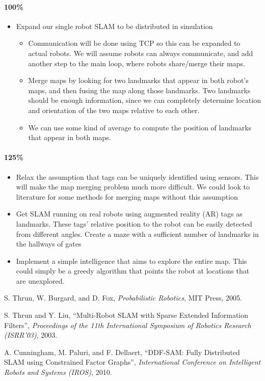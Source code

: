 \documentclass[11pt]{article}
\begin{document}
\paragraph{100\%}

\begin{itemize}
    \item Expand our single robot SLAM to be distributed in simulation
    \begin{itemize}
        \item Communication will be done using TCP so this can be expanded to actual robots. We will assume robots can always communicate, and add another step to the main loop, where robots share/merge their maps.
        \item Merge maps by looking for two landmarks that appear in both robot's maps, and then fusing the map along those landmarks. Two landmarks should be enough information, since we can completely determine location and orientation of the two maps relative to each other.
        \item We can use some kind of average to compute the position of landmarks that appear in both maps.
    \end{itemize}
\end{itemize}

\paragraph{125\%}
\begin{itemize}
    \item Relax the assumption that tags can be uniquely identified using sensors. This will make the map merging problem much more difficult. We could look to literature for some methods for merging maps without this assumption
    \item Get SLAM running on real robots using augmented reality (AR) tags as landmarks. These tags' relative position to the robot can be easily detected from different angles. Create a maze with a sufficient number of landmarks in the hallways of gates
    \item Implement a simple intelligence that aims to explore the entire map. This could simply be a greedy algorithm that points the robot at locations that are unexplored.
\end{itemize}

\begin{thebibliography}{12}
        S. Thrun, W. Burgard, and D. Fox, \emph{Probabilistic Robotics}, MIT Press, 2005.

        S. Thrun and Y. Liu, ``Multi-Robot SLAM with Sparse Extended Information Filters'', \emph{Proceedings of the 11th International Symposium of Robotics Research (ISRR'03)}, 2003.

        A. Cunningham, M. Paluri, and F. Dellaert, ``DDF-SAM: Fully Distributed SLAM using Constrained Factor Graphs'', \emph{International Conference on Intelligent Robots and Systems (IROS)}, 2010.

\end{thebibliography}
\end{document}
